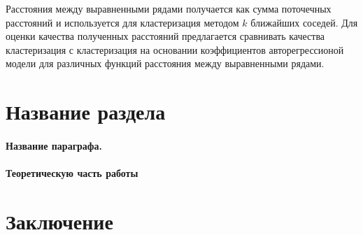 \documentclass[12pt,twoside]{article}
\begin{document}
        Расстояния между выравненными рядами получается как сумма поточечных расстояний и используется для кластеризация методом $k$\- ближайших соседей.
        Для оценки качества полученных расстояний предлагается сравнивать качества кластеризация с кластеризация на основании коэффициентов авторегрессионой модели для различных функций расстояния между выравненными рядами.
        

    \section{Название раздела}
    \paragraph{Название параграфа.}
    \paragraph{Теоретическую часть работы}
    \section{Заключение}

     
    
    
    
\end{document}

